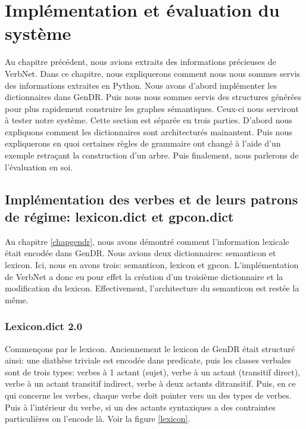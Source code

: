 
\chapter{Implémentation et évaluation du système}\label{eval}

Au chapitre précédent, nous avions extraits des informations précieuses de VerbNet. Dans ce chapitre, nous expliquerons comment nous nous sommes servis des informations extraites en Python. Nous avons d'abord implémenter les dictionnaires dans GenDR. Puis nous nous sommes servis des structures générées pour plus rapidement construire les graphes sémantiques. Ceux-ci nous serviront à tester notre système. Cette section est séparée en trois parties. D'abord nous expliquons comment les dictionnaires sont architecturés mainantent. Puis nous expliquerons en quoi certaines règles de grammaire ont changé à l'aide d'un exemple retraçant la construction d'un arbre. Puis finalement, nous parlerons de l'évaluation en soi.

\section{Implémentation des verbes et de leurs patrons de régime: lexicon.dict et gpcon.dict}

Au chapitre \ref{chapgendr}, nous avons démontré comment l'information lexicale était encodée dans GenDR. Nous avions deux dictionnaires: semanticon et lexicon. Ici, nous en avons trois: semanticon, lexicon et gpcon. L'implémentation de VerbNet a donc eu pour effet la création d'un troisième dictionnaire et la modification du lexicon. Effectivement, l'architecture du semanticon est restée la même.

\subsection{Lexicon.dict 2.0}
Commençons par le lexicon. Anciennement le lexicon de GenDR était structuré ainsi: une diathèse triviale est encodée dans predicate, puis les classes verbales sont de trois types: verbes à 1 actant (sujet), verbe à un actant (transitif direct), verbe à un actant transitif indirect, verbe à deux actants ditransitif. Puis, en ce qui concerne les verbes, chaque verbe doit pointer vers un des types de verbes. Puis à l'intérieur du verbe, si un des actants syntaxiques a des contraintes particulières on l'encode là. Voir la figure \ref{lexicon}.

